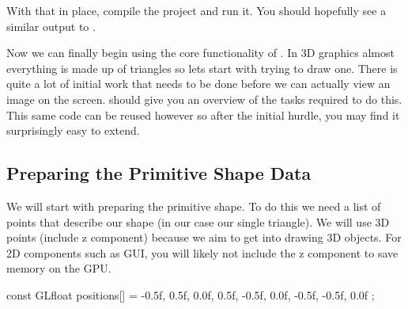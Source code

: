 \documentclass[10pt]{article}
\begin{document}
With that in place, compile the project and run it. You should hopefully
see a similar output to .


Now we can finally begin using the core functionality of . In
3D graphics almost everything is made up of triangles so lets start with
trying to draw one. There is quite a lot of initial work that needs to be
done before we can actually view an image on the screen. 
should give you an overview of the tasks required to do this. This same
code can be reused however so after the initial hurdle, you may find it
surprisingly easy to extend.


\subsection*{Preparing the Primitive Shape Data}
We will start with preparing the primitive shape. To do this we need a
list of points that describe our shape (in our case our single triangle).
We will use 3D points (include z component) because we aim to get into
drawing 3D objects. For 2D components such as GUI, you will likely not
include the z component to save memory on the GPU.

\begin{Listing}

  const GLfloat positions[] = {
    -0.5f, 0.5f, 0.0f,
    0.5f, -0.5f, 0.0f,
    -0.5f, -0.5f, 0.0f
  };

\end{Listing}


\end{document}
